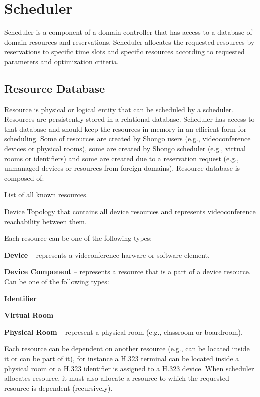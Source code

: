 \newcommand{\SchedulerInputCode}[1]{
\CodeStyle{}
\CodeStyleAppendLanguage
\vspace{2mm}

}

\chapter{Scheduler}

Scheduler is a component of a domain controller that has access to a database 
of domain resources and reservations. Scheduler allocates the requested 
resources by reservations to specific time slots and specific resources 
according to requested parameters and optimization criteria.

\section{Resource Database}

Resource is physical or logical entity that can be scheduled by a scheduler. 
Resources are persistently stored in a relational database. Scheduler has 
access to that database and should keep the resources in memory in an 
efficient form for scheduling. Some of resources are created by Shongo users 
(e.g., videoconference devices or physical rooms), some are created by Shongo 
scheduler (e.g., virtual rooms or identifiers) and some are created due to a 
reservation request (e.g., unmanaged devices or resources from foreign 
domains). Resource database is composed of:
\begin{compactenum}
\item List of all known resources.
\item Device Topology that contains all device resources and represents 
videoconference reachability between them.
\end{compactenum}
Each resource can be one of the following types:
\begin{compactenum}
\item \textbf{Device} -- represents a videconference harware or software 
  element.
\item \textbf{Device Component} -- represents a resource that is a part of a 
  device resource. Can be one of the following types:
  \begin{compactenum}
    \item \textbf{Identifier}
    \item \textbf{Virtual Room}
  \end{compactenum}
\item \textbf{Physical Room} -- represent a physical room (e.g., classroom or 
  boardroom).
\end{compactenum}
Each resource can be dependent on another resource (e.g., can be located 
inside it or can be part of it), for instance a H.323 terminal can be located 
inside a physical room or a H.323 identifier is assigned to a H.323 device. 
When scheduler allocates resource, it must also allocate a resource to which 
the requested resource is dependent (recursively).

